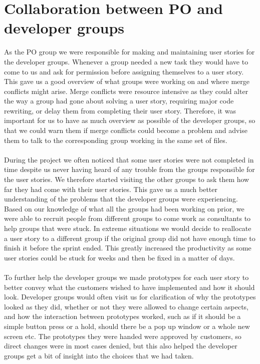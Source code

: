 \section{Collaboration between PO and developer groups}
As the PO group we were responsible for making and maintaining user stories for the developer groups.
Whenever a group needed a new task they would have to come to us and ask for permission before assigning themselves to a user story.
This gave us a good overview of what groups were working on and where merge conflicts might arise.
Merge conflicts were resource intensive as they could alter the way a group had gone about solving a user story, requiring major code rewriting, or delay them from completing their user story.
Therefore, it was important for us to have as much overview as possible of the developer groups, so that we could warn them if merge conflicts could become a problem and advise them to talk to the corresponding group working in the same set of files.
\\
\\
During the project we often noticed that some user stories were not completed in time despite us never having heard of any trouble from the groups responsible for the user stories.
We therefore started visiting the other groups to ask them how far they had come with their user stories.
This gave us a much better understanding of the problems that the developer groups were experiencing. 
Based on our knowledge of what all the groups had been working on prior, we were able to recruit people from different groups to come work as consultants to help groups that were stuck.
In extreme situations we would decide to reallocate a user story to a different group if the original group did not have enough time to finish it before the sprint ended.
This greatly increased the productivity as some user stories could be stuck for weeks and then be fixed in a matter of days.
\\
\\
To further help the developer groups we made prototypes for each user story to better convey what the customers wished to have implemented and how it should look.
Developer groups would often visit us for clarification of why the prototypes looked as they did, whether or not they were allowed to change certain aspects, and how the interaction between prototypes worked, such as if it should be a simple button press or a hold, should there be a pop up window or a whole new screen etc.
The prototypes they were handed were approved by customers, so direct changes were in most cases denied, but this also helped the developer groups get a bit of insight into the choices that we had taken.

